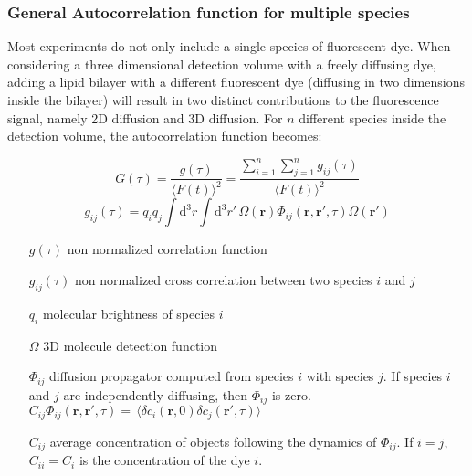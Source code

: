 	\subsubsection{General Autocorrelation function for multiple species}
	Most experiments do not only include a single species of fluorescent dye. When considering a three dimensional detection volume with a freely diffusing dye, adding a lipid bilayer with a different fluorescent dye (diffusing in two dimensions inside the bilayer) will result in two distinct contributions to the fluorescence signal, namely 2D diffusion and 3D diffusion. For $n$ different species inside the detection volume, the autocorrelation function becomes:
	\newline
	\newline
	\begin{minipage}{\textwidth}
	\begin{equation}
	G(\tau) = \frac{g(\tau)}{\langle F(t) \rangle^2} =  \frac{\sum_{i=1}^n \sum_{j=1}^n g_{ij}(\tau)}{\langle F(t) \rangle^2}
	\end{equation}
	\begin{equation}
	g_{ij}(\tau) = q_i q_j \int \! \mathrm{d}^3 r \int \! \mathrm{d}^3 r'  \, \Omega(\mathbf{r})\Phi_{ij}(\mathbf{r}, \mathbf{r'}, \tau) \Omega(\mathbf{r'})  
	\end{equation}
	\begin{itemize} \small
	\item[$g(\tau)$] non normalized correlation function
	\item[$g_{ij}(\tau)$] non normalized cross correlation between two species $i$ and $j$
	\item[$q_i$] molecular brightness of species $i$
	\item[$\Omega$] 3D molecule detection function
	\item[$\Phi_{ij}$] diffusion propagator computed from species $i$ with species $j$. If species $i$ and $j$ are independently diffusing, then $\Phi_{ij}$ is zero. 
	$ C_{ij} \Phi_{ij}(\mathbf{r}, \mathbf{r'}, \tau) = \, \langle \delta c_i(\mathbf{r},0) \delta c_j(\mathbf{r'}, \tau) \rangle $ 
	\item[$C_{ij}$] average concentration of objects following the dynamics of $\Phi_{ij}$. If $i=j$, $C_{ii}=C_i$ is the concentration of the dye $i$.
	\end{itemize}
	\end{minipage}
	\newline
	\newline
